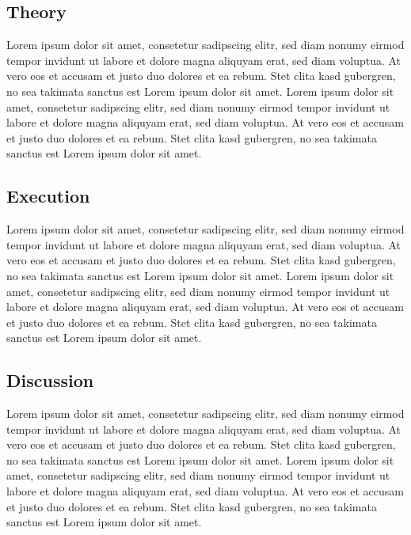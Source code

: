 \subsection{Theory}
Lorem ipsum dolor sit amet, consetetur sadipscing elitr, sed diam nonumy eirmod tempor invidunt ut labore et dolore magna aliquyam erat, sed diam voluptua. At vero eos et accusam et justo duo dolores et ea rebum. Stet clita kasd gubergren, no sea takimata sanctus est Lorem ipsum dolor sit amet. Lorem ipsum dolor sit amet, consetetur sadipscing elitr, sed diam nonumy eirmod tempor invidunt ut labore et dolore magna aliquyam erat, sed diam voluptua. At vero eos et accusam et justo duo dolores et ea rebum. Stet clita kasd gubergren, no sea takimata sanctus est Lorem ipsum dolor sit amet.
\subsection{Execution}
Lorem ipsum dolor sit amet, consetetur sadipscing elitr, sed diam nonumy eirmod tempor invidunt ut labore et dolore magna aliquyam erat, sed diam voluptua. At vero eos et accusam et justo duo dolores et ea rebum. Stet clita kasd gubergren, no sea takimata sanctus est Lorem ipsum dolor sit amet. Lorem ipsum dolor sit amet, consetetur sadipscing elitr, sed diam nonumy eirmod tempor invidunt ut labore et dolore magna aliquyam erat, sed diam voluptua. At vero eos et accusam et justo duo dolores et ea rebum. Stet clita kasd gubergren, no sea takimata sanctus est Lorem ipsum dolor sit amet.
\subsection{Discussion}
Lorem ipsum dolor sit amet, consetetur sadipscing elitr, sed diam nonumy eirmod tempor invidunt ut labore et dolore magna aliquyam erat, sed diam voluptua. At vero eos et accusam et justo duo dolores et ea rebum. Stet clita kasd gubergren, no sea takimata sanctus est Lorem ipsum dolor sit amet. Lorem ipsum dolor sit amet, consetetur sadipscing elitr, sed diam nonumy eirmod tempor invidunt ut labore et dolore magna aliquyam erat, sed diam voluptua. At vero eos et accusam et justo duo dolores et ea rebum. Stet clita kasd gubergren, no sea takimata sanctus est Lorem ipsum dolor sit amet.
